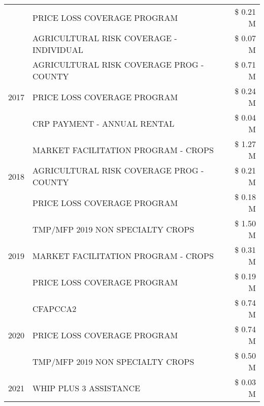\begin{tabular}{llr}
 & PRICE LOSS COVERAGE PROGRAM & \$ 0.21 M \\
 & AGRICULTURAL RISK COVERAGE - INDIVIDUAL & \$ 0.07 M \\
\cline{1-3}
\multirow[t]{3}{*}{2017} & AGRICULTURAL RISK COVERAGE PROG - COUNTY & \$ 0.71 M \\
 & PRICE LOSS COVERAGE PROGRAM & \$ 0.24 M \\
 & CRP PAYMENT - ANNUAL RENTAL & \$ 0.04 M \\
\cline{1-3}
\multirow[t]{3}{*}{2018} & MARKET FACILITATION PROGRAM - CROPS & \$ 1.27 M \\
 & AGRICULTURAL RISK COVERAGE PROG - COUNTY & \$ 0.21 M \\
 & PRICE LOSS COVERAGE PROGRAM & \$ 0.18 M \\
\cline{1-3}
\multirow[t]{3}{*}{2019} & TMP/MFP 2019 NON SPECIALTY CROPS & \$ 1.50 M \\
 & MARKET FACILITATION PROGRAM - CROPS & \$ 0.31 M \\
 & PRICE LOSS COVERAGE PROGRAM & \$ 0.19 M \\
\cline{1-3}
\multirow[t]{3}{*}{2020} & CFAPCCA2 & \$ 0.74 M \\
 & PRICE LOSS COVERAGE PROGRAM & \$ 0.74 M \\
 & TMP/MFP 2019 NON SPECIALTY CROPS & \$ 0.50 M \\
\cline{1-3}
2021 & WHIP PLUS 3 ASSISTANCE & \$ 0.03 M \\
\cline{1-3}
\bottomrule
\end{tabular}
